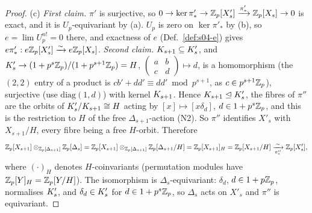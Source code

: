 \begin{proof}
(c) \emph{First claim.} $\pi'$ is surjective, so $0\to\ker\pi'_*\to\mathbb{Z}_p[X'_s]\xrightarrow{\pi'_*}\mathbb{Z}_p[X_s]\to0$ is exact, and it is
$U_p$-equivariant by (a). $U_p$ is zero on $\ker\pi'_*$ by (b), so $e=\lim U_p^{n!}=0$ there, and exactness of $e$
(Def.~\ref{def:s04-e}) gives $e\pi'_*:e\mathbb{Z}_p[X'_s]\xrightarrow{\sim}e\mathbb{Z}_p[X_s]$.
\emph{Second claim.} $K_{s+1}\subseteq K'_{s}$, and $K'_{s}\to(1+p^s\mathbb{Z}_p)/(1+p^{s+1}\mathbb{Z}_p)=H$,
$\left(\begin{smallmatrix}a&b\\c&d\end{smallmatrix}\right)\mapsto d$, is a homomorphism (the $(2,2)$ entry of a product is
$cb'+dd'\equiv dd'\bmod p^{s+1}$, as $c\in p^{s+1}\mathbb{Z}_p$), surjective (use $\mathrm{diag}(1,d)$) with kernel $K_{s+1}$. Hence
$K_{s+1}\trianglelefteq K'_{s}$, the fibres of $\pi''$ are the orbits of $K'_{s}/K_{s+1}\cong H$ acting by $[x]\mapsto[x\delta_d]$,
$d\in1+p^s\mathbb{Z}_p$, and this is the restriction to $H$ of the free $\Delta_{s+1}$-action (N2). So $\pi''$ identifies $X'_s$ with
$X_{s+1}/H$, every fibre being a free $H$-orbit. Therefore
\[\mathbb{Z}_p[X_{s+1}]\otimes_{\mathbb{Z}_p[\Delta_{s+1}]}\mathbb{Z}_p[\Delta_s]=\mathbb{Z}_p[X_{s+1}]\otimes_{\mathbb{Z}_p[\Delta_{s+1}]}\mathbb{Z}_p[\Delta_{s+1}/H]
=\mathbb{Z}_p[X_{s+1}]_H=\mathbb{Z}_p[X_{s+1}/H]\xrightarrow[\pi''_*]{\sim}\mathbb{Z}_p[X'_s],\]
where $(\cdot)_H$ denotes $H$-coinvariants (permutation modules have $\mathbb{Z}_p[Y]_H=\mathbb{Z}_p[Y/H]$). The isomorphism is $\Delta_s$-equivariant:
$\delta_d$, $d\in1+p\mathbb{Z}_p$, normalises $K'_{s}$, and $\delta_d\in K'_{s}$ for $d\in1+p^s\mathbb{Z}_p$, so $\Delta_s$ acts on $X'_s$ and $\pi''$ is
equivariant.


\end{proof}
